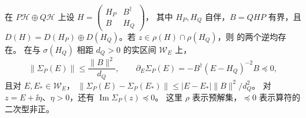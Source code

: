 \begin{theorem}[投影自能的谱隙变化界]
在 $P\mathcal H\oplus Q\mathcal H$ 上设
$H=\left(\begin{smallmatrix}H_P&B^\dagger\\ B&H_Q\end{smallmatrix}\right)$，
其中 $H_P,H_Q$ 自伴，$B=QHP$ 有界，且
$D(H)=D(H_P)\oplus D(H_Q)$。若 $z\in\rho(H)\cap\rho(H_Q)$，则
 的两个逆均存在。
在与 $\sigma(H_Q)$ 相距 $d_Q>0$ 的实区间 $\mathcal W_E$ 上，
\[
\|\Sigma_P(E)\|\le\frac{\|B\|^2}{d_Q},\qquad
\partial_E\Sigma_P(E)=-B^\dagger(E-H_Q)^{-2}B\preceq0,
\]
且对 $E,E_*\in\mathcal W_E$，
$\|\Sigma_P(E)-\Sigma_P(E_*)\|\le |E-E_*|\|B\|^2/d_Q^2$。
对 $z=E+\ii\eta$、$\eta>0$，还有 $\operatorname{Im}\Sigma_P(z)\preceq0$。
这里 $\rho$ 表示预解集，$\preceq0$ 表示算符的二次型非正。
\end{theorem}
